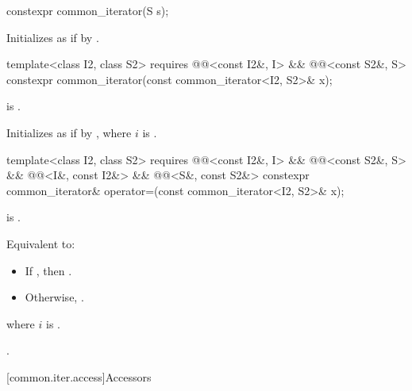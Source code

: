 %
\begin{itemdecl}
constexpr common_iterator(S s);
\end{itemdecl}

\begin{itemdescr}
\pnum
\effects
Initializes  as if by
.
\end{itemdescr}

%
\begin{itemdecl}
template<class I2, class S2>
  requires @@<const I2&, I> && @@<const S2&, S>
    constexpr common_iterator(const common_iterator<I2, S2>& x);
\end{itemdecl}

\begin{itemdescr}
\pnum
\hardexpects
{} is .

\pnum
\effects
Initializes  as if by
,
where $i$ is .
\end{itemdescr}

%
\begin{itemdecl}
template<class I2, class S2>
  requires @@<const I2&, I> && @@<const S2&, S> &&
           @@<I&, const I2&> && @@<S&, const S2&>
    constexpr common_iterator& operator=(const common_iterator<I2, S2>& x);
\end{itemdecl}

\begin{itemdescr}
\pnum
\hardexpects
{} is .

\pnum
\effects
Equivalent to:
\begin{itemize}
\item If , then
.

\item Otherwise, .
\end{itemize}
where $i$ is .

\pnum
\returns
{}.
\end{itemdescr}

[common.iter.access]{Accessors}

